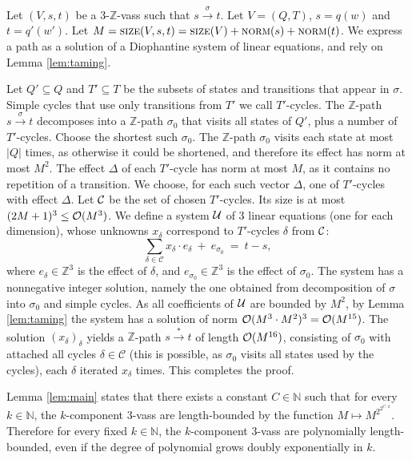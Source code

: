 \documentclass[a4paper, UKenglish, cleveref, autoref, thm-restate]{lipics-v2021}
\newcommand{\N}{\mathbb{N}}
\newcommand{\Z}{\mathbb{Z}}
\newcommand{\card}[1]{\left|#1\right|}
\newcommand{\trans}[1]{\stackrel{#1}{\longrightarrow}}
\newcommand{\tran}{\trans{*}}
\newcommand{\norm}{\textsc{norm}}
\newcommand{\size}{\textsc{size}}
\newcommand{\plb}{polynomially length-bounded\xspace}
\newcommand{\kbound}[2]{{#1}^{2^{2^{#2}}}}
\newcommand{\OO}{{\cal O}}
\newcommand{\vass}{{\sc vass}\xspace}
\newcommand{\tvass}{\parvass 3}
\newcommand{\tzvass}{\parzvass 3}
\newcommand{\parvass}[1]{{$#1$-\vass}\xspace}
\newcommand{\parzvass}[1]{{$#1$-$\Z$-\vass}\xspace}
\begin{document}
\begin{appendixproof}
Let $(V, s, t)$ be a \tzvass such that $s\trans{\sigma} t$.
Let $V=(Q,T)$, $s=q(w)$ and $t=q'(w')$.
Let $M = \size(V, s, t) = \size(V) + \norm(s) + \norm(t)$.
We express a path as a solution of a Diophantine system of linear equations, and rely
on Lemma \ref{lem:taming}.

Let $Q'\subseteq Q$ and $T'\subseteq T$ be the subsets of states and transitions that appear in $\sigma$.
Simple cycles that use only transitions from $T'$ we call $T'$-cycles.
The $\Z$-path $s\trans{\sigma} t$ decomposes into a $\Z$-path $\sigma_0$ that visits all states of $Q'$,
plus a number of $T'$-cycles.
Choose the shortest such $\sigma_0$.
The $\Z$-path $\sigma_0$ visits each state at most $\card Q$ times, as otherwise it could be shortened,
and therefore its effect has norm at most $M^2$.
The effect $\Delta$ of each $T'$-cycle has norm at most $M$, as it contains no repetition of a transition.
We choose, for each such vector $\Delta$, one of $T'$-cycles with effect $\Delta$.
Let $\cal C$ be the set of chosen $T'$-cycles. 
Its size is at most $(2M+1)^3 \leq \OO(M^3)$.
We define a system $\cal U$
of 3 linear equations (one for each dimension), whose unknowns $x_\delta$ correspond to $T'$-cycles $\delta$ from $\cal C$:
\[
\sum_{\delta\in \mathcal{C}} x_{\delta} \cdot e_\delta \ + \ e_{\sigma_0} \ = \ t - s,
\]
where $e_\delta\in\Z^3$ is the effect of $\delta$, 
and $e_{\sigma_0}\in\Z^3$ is the effect of $\sigma_0$.
The system has a nonnegative integer solution, namely the one obtained from decomposition of $\sigma$
into $\sigma_0$ and simple cycles.
As all coefficients of $\cal U$ are bounded by $M^2$,
by Lemma \ref{lem:taming} the system has a solution of norm $\OO(M^3\cdot M^2)^3=\OO(M^{15})$.
The solution $(x_\delta)_\delta$ 
yields a $\Z$-path $s\tran t$ of length $\OO(M^{16})$, consisting of $\sigma_0$ with
attached all cycles $\delta\in\mathcal{C}$
(this is possible, as $\sigma_0$ visits all states used by the cycles),
each $\delta$ iterated $x_\delta$ times.
This completes the proof.
\end{appendixproof}
Lemma \ref{lem:main} states that there exists a constant $C\in\N$ such that
for every $k\in\N$, the $k$-component \tvass are 
length-bounded by the function $M\mapsto \kbound {M} {C\cdot k}$.
Therefore for every fixed $k\in\N$, the $k$-component \tvass are \plb,
even if the degree of polynomial grows doubly exponentially in $k$.

 
\end{document}

